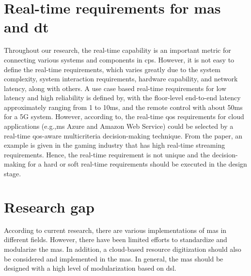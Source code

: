 \section{Real-time requirements for \gls{mas} and \gls{dt}}
Throughout our research, the real-time capability is an important metric for connecting 
various systems and components in \gls{cps}. However, it is not easy to define the 
real-time requirements, which varies greatly due to the system complexity, 
system interaction requirements, hardware capability, and network latency, 
along with others. 
A use case based real-time requirements for low latency and high reliability 
is defined by\cite{li_5g_2018}, with the floor-level end-to-end latency 
approximately ranging from 1 to 10ms, and the remote control with about 50ms for a 5G 
system. However, according to\cite{zhang_infrastructure_2017}, the real-time 
\gls{qos} requirements for cloud applications (e.g.,\gls{ms} Azure and Amazon Web Service) 
could be selected by a real-time \gls{qos}-aware multicriteria decision-making 
technique. From the paper, an example is given in the gaming industry that has 
high real-time streaming requirements. Hence, the real-time requirement is not unique 
and the decision-making for a hard or 
soft real-time requirements should be executed in the design stage. 

\section{Research gap}

According to current research, there are various implementations of \gls{mas} in 
different fields. However, there have been limited efforts to standardize and 
modularize the \gls{mas}. In addition, a cloud-based resource digitization should also 
be considered and implemented in the \gls{mas}. In general, the \gls{mas} should be designed 
with a high level of modularization based on \gls{dsl}.

